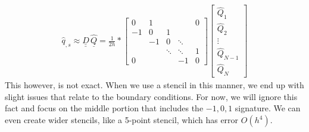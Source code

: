 \documentclass[12pt]{article}
\newcommand{\bunderline}[1]{\underline{#1}}
\renewcommand{\vec}[1]{{\bunderline{#1}}}
\newcommand{\mat}[1]{{\bunderline{\bunderline{#1}}}}
\begin{document}
\begin{align*}
\widehat{q}_{,s} \approx \mat{D}\,\widehat{\vec{Q}} = \frac{1}{2h}* \begin{bmatrix} 0&1&  &  &0 \\ -1&0&1  &  & \\   &-1&0&\ddots  &  \\   &  &\ddots&\ddots&1 \\ 0&  &  &-1&0 \end{bmatrix} \begin{bmatrix} \widehat{Q}_1 \\ \widehat{Q}_2 \\ \vdots \\ \widehat{Q}_{N-1} \\ \widehat{Q}_N \end{bmatrix}
\end{align*}
This however, is not exact. When we use a stencil in this manner, we end up with slight issues that relate to the boundary conditions. For now, we will ignore this fact and focus on the middle portion that includes the $-1, 0, 1$ signature. We can even create wider stencils, like a 5-point stencil, which has error $O(h^4)$.
\end{document}
